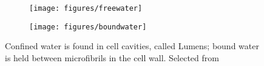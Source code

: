 \documentclass[a4paper,11pt]{report}
\begin{document}
\begin{figure}[h]

\begin{subfigure}{0.5\textwidth}
\texttt{[image: figures/freewater]} 


\end{subfigure}
\begin{subfigure}{0.5\textwidth}
\texttt{[image: figures/boundwater]}


\end{subfigure}
 


\caption{Confined water is found in cell cavities, called Lumens; bound water is held between microfibrils in the cell wall. Selected from \cite{duewood}}\label{wood}
\end{figure}
\end{document}
